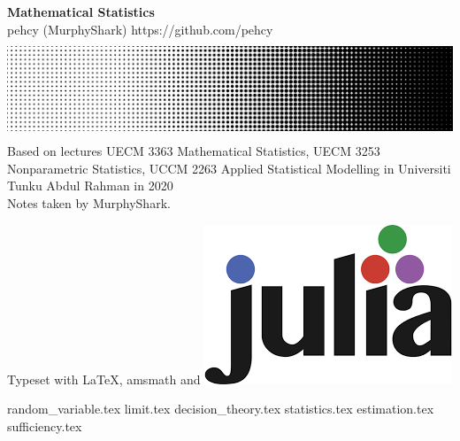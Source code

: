 \documentclass[11pt,twoside]{report}
\begin{document}
\begin{titlepage}
  \centering
  \vfill
  {\Large
      \textbf{Mathematical Statistics}\\
      \vskip2cm
      pehcy (MurphyShark) \quad \textsf{https://github.com/pehcy} \\
  }    
  \vfill
  \includegraphics[width=0.8\paperwidth, height=3cm]{./src/images/HalftoneGradient.png} %
  \vskip2cm
  {
    Based on lectures UECM 3363 Mathematical Statistics, UECM 3253 Nonparametric Statistics, UCCM 2263 Applied Statistical Modelling in Universiti Tunku Abdul Rahman in 2020\\
    Notes taken by MurphyShark.
  }
  \vfill
  \begin{flushleft}
    \footnotesize Typeset with \LaTeX, amsmath and \includegraphics[scale=0.06, height=3ex]{./src/images/Julia.png}
  \end{flushleft}
\end{titlepage}
{random_variable.tex}
{limit.tex}
{decision_theory.tex}
{statistics.tex}
{estimation.tex}
{sufficiency.tex}
\end{document}
